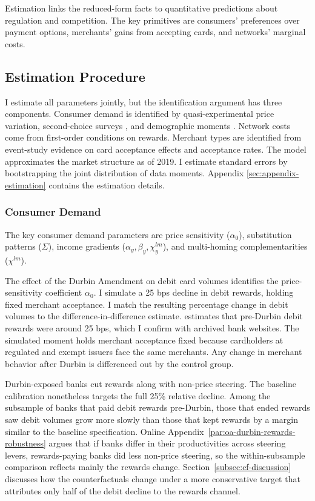 \documentclass[main.tex]{subfiles}
\begin{document}
Estimation links the reduced-form facts to quantitative predictions about regulation and competition.
The key primitives are consumers' preferences over payment options, merchants' gains from accepting cards, and networks' marginal costs.

\subsection{Estimation Procedure}
\label{subsec:estimation-procedure}

I estimate all parameters jointly, but the identification argument has three components.
Consumer demand is identified by quasi-experimental price variation, second-choice surveys \parencite{Berry.etal2004}, and demographic moments \parencite{Petrin2002}.
Network costs come from first-order conditions on rewards.
Merchant types are identified from event-study evidence on card acceptance effects and acceptance rates.
The model approximates the market structure as of 2019.
I estimate standard errors by bootstrapping the joint distribution of data moments.
Appendix \ref{sec:appendix-estimation} contains the estimation details.

\subsubsection{Consumer Demand}
\label{subsubsec:estim-reward-sens}

The key consumer demand parameters are price sensitivity ($\alpha_0$), substitution patterns ($\Sigma$), income gradients ($\alpha_y, \beta_y, \chi^{lm}_y$), and multi-homing complementarities ($\chi^{lm}$).

The effect of the Durbin Amendment on debit card volumes identifies the price-sensitivity coefficient $\alpha_0$.
I simulate a 25 bps decline in debit rewards, holding fixed merchant acceptance.
I match the resulting percentage change in debit volumes to the difference-in-difference estimate.
\textcite{Hayashi2012} estimates that pre-Durbin debit rewards were around 25 bps, which I confirm with archived bank websites.
The simulated moment holds merchant acceptance fixed because cardholders at regulated and exempt issuers face the same merchants.
Any change in merchant behavior after Durbin is differenced out by the control group.

Durbin-exposed banks cut rewards along with non-price steering.
The baseline calibration nonetheless targets the full 25\% relative decline.
Among the subsample of banks that paid debit rewards pre-Durbin, those that ended rewards saw debit volumes grow more slowly than those that kept rewards by a margin similar to the baseline specification.
Online Appendix~\ref{par:oa-durbin-rewards-robustness} argues that if banks differ in their productivities across steering levers, rewards-paying banks did less non-price steering, so the within-subsample comparison reflects mainly the rewards change.
Section~\ref{subsec:cf-discussion} discusses how the counterfactuals change under a more conservative target that attributes only half of the debit decline to the rewards channel.
\end{document}
